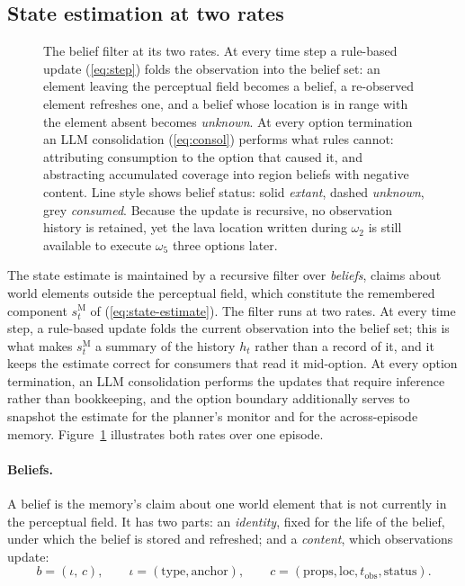 \documentclass[11pt]{article}
\newcommand{\sM}{s^{\mathrm{M}}}
\newcommand{\loc}{\mathrm{loc}}
\newcommand{\stat}{\mathrm{status}}
\newcommand{\props}{\mathrm{props}}
\newcommand{\anchor}{\mathrm{anchor}}
\newcommand{\type}{\mathrm{type}}
\newcommand{\tobs}{t_{\mathrm{obs}}}
\begin{document}
\subsection{State estimation at two rates}
\label{sec:type1-est}
\begin{figure}[t]
\centering

\caption{The belief filter at its two rates. At every time step a rule-based update (\ref{eq:step}) folds the observation into the belief set: an element leaving the perceptual field becomes a belief, a re-observed element refreshes one, and a belief whose location is in range with the element absent becomes \emph{unknown}. At every option termination an LLM consolidation (\ref{eq:consol}) performs what rules cannot: attributing consumption to the option that caused it, and abstracting accumulated coverage into region beliefs with negative content. Line style shows belief status: solid \emph{extant}, dashed \emph{unknown}, grey \emph{consumed}. Because the update is recursive, no observation history is retained, yet the lava location written during $\omega_2$ is still available to execute $\omega_5$ three options later.}
\label{fig:estimation}
\end{figure}


The state estimate is maintained by a recursive filter over \emph{beliefs}, claims about world elements outside the perceptual field, which constitute the remembered component $\sM_t$ of (\ref{eq:state-estimate}). The filter runs at two rates. At every time step, a rule-based update folds the current observation into the belief set; this is what makes $\sM_t$ a summary of the history $h_t$ rather than a record of it, and it keeps the estimate correct for consumers that read it mid-option. At every option termination, an LLM consolidation performs the updates that require inference rather than bookkeeping, and the option boundary additionally serves to snapshot the estimate for the planner's monitor and for the across-episode memory. Figure~\ref{fig:estimation} illustrates both rates over one episode.

\paragraph{Beliefs.}
A belief is the memory's claim about one world element that is not currently in the perceptual field. It has two parts: an \emph{identity}, fixed for the life of the belief, under which the belief is stored and refreshed; and a \emph{content}, which observations update:
\begin{equation}
b=(\iota,\,c),\qquad
\iota=(\type,\anchor),\qquad
c=(\props,\loc,\tobs,\stat).
\label{eq:belief}
\end{equation}
\end{document}

